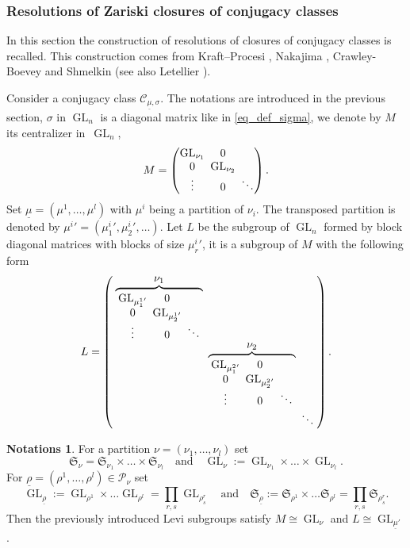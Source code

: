 \documentclass[11pt]{article}
\let\ts\textstyle
\newcommand{\quand}{\quad\text{and}\quad}
\theoremstyle{definition}
\newtheorem{notations}[definition]{Notations}
\theoremstyle{plain}
\DeclareMathOperator{\GL}{GL}
\newcommand{\Sym}{\mathfrak{S}}
\newcommand{\Part}{\mathcal{P}}
\begin{document}
\subsubsection{Resolutions of Zariski closures of conjugacy classes}\label{subsect_resolution_conjugacy}
In this section the construction of resolutions of closures of conjugacy classes is recalled.
This construction comes from Kraft--Procesi \cite{Kraft_Procesi_80}, Nakajima \cite{Nakajima_1998,Nakajima_01}, Crawley-Boevey \cite{Crawley-Boevey_parabolic, Crawley-Boevey2003} and Shmelkin \cite{Shmelkin2009} (see also Letellier \cite{Letellier_gl}).

Consider a conjugacy class $\mathcal{C}_{\underline{\mu},\sigma}$. The notations are introduced in the previous section, $\sigma$ in $\GL_n$ is a diagonal matrix like in \eqref{eq_def_sigma}, we denote by $M$ its centralizer in~$\GL_n$,
\[\arraycolsep2.5pt
M=\begin{pmatrix}
\GL_{\nu_1} & 0 & \\
0 & \GL_{\nu_2} & \\
\vdots & 0 & \ddots
\end{pmatrix}.
\]
Set $\underline{\mu}=(\mu^{1},\dots,\mu^{l})$ with $\mu^{i}$ being a partition of $\nu_i$. The transposed partition is denoted by ${\mu^{i}}'=({\mu^{i}_1}',{\mu^{i}_2}',\dots) $. Let $L$ be the subgroup of $\GL_n$ formed by block diagonal matrices with blocks of size ${\mu^{i}_r}'$, it is a subgroup of $M$ with the following form
\[\arraycolsep2.5pt
L=\left(
\begin{array}{ccccc}
\overbrace{
\begin{array}{ccccc}
\GL_{{\mu^{1}_1}' } & 0 & \\
0 & \GL_{{\mu^{1}_2}' } & \\
\vdots & 0 & \ddots
\end{array}
}^{\ts\nu_1} & & \\
& \overbrace{
\begin{array}{ccccc}
\GL_{{\mu^{2}_1}' } & 0 & \\
0 & \GL_{{\mu^{2}_2}' } & \\
\vdots & 0 & \ddots
\end{array}
}^{\ts\nu_2} & \\
& & \ddots
\end{array}
\right).
\]
\begin{notations}\label{notations_group_part}
For a partition $\nu=(\nu_1,\dots,\nu_l)$ set
\[
\Sym_{\nu}= \Sym_{\nu_1}\times\dots\times \Sym_{\nu_l} \quand \GL_{\nu}:=\GL_{\nu_1}\times\dots\times\GL_{\nu_l}.
\]
For $\underline{\rho}=(\rho^1,\dots,\rho^l)\in \Part_{\nu}$ set
\[
\GL_{\underline{\rho}}:=\GL_{\rho^1}\times\dots\GL_{\rho^l}=\prod_{r,s}\GL_{\rho^r_s}
\quand\Sym_{\underline{\rho}} :=\Sym_{\rho^1}\times\dots\Sym_{\rho^l}=\prod_{r,s}\Sym_{\rho^r_s}.
\]
Then the previously introduced Levi subgroups satisfy $M\cong \GL_{\nu}$ and $L\cong \GL_{\underline{\mu}'}$.
\end{notations}
\end{document}
